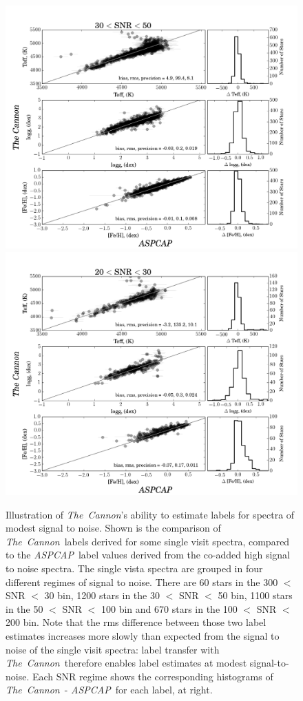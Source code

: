 \documentclass[12pt, preprint]{aastex}
\newcommand{\tc}{\textsl{The~Cannon}}
\newcommand{\aspcap}{\textsl{ASPCAP}}
\begin{document}
\begin{figure}[!h]
\includegraphics[scale=0.25]{./plots/SNR30to50.png}
\includegraphics[scale=0.25]{./plots/SNR20to30.png}
    \caption{Illustration of \tc's ability to estimate labels for spectra of modest signal to noise. Shown is the comparison of \tc\ labels derived for some single visit spectra, compared to the \aspcap\ label values derived from the co-added high signal to noise spectra. The single vista spectra are grouped in four different regimes of signal to noise. There are 60 stars in the 300 $<$  SNR $<$ 30 bin, 1200 stars in the 30 $<$ SNR $<$ 50 bin, 1100 stars in the 50 $<$ SNR $<$ 100 bin and 670 stars in the 100 $<$  SNR $<$ 200 bin. Note that the rms difference between those two label estimates increases more slowly than expected from the signal to noise of the single visit spectra: label transfer with \tc\  therefore enables label estimates at modest signal-to-noise. Each SNR regime shows the corresponding histograms of \tc\ - \aspcap\ for each label, at right.}
\label{fig:SNR}
\end{figure}
\end{document}
